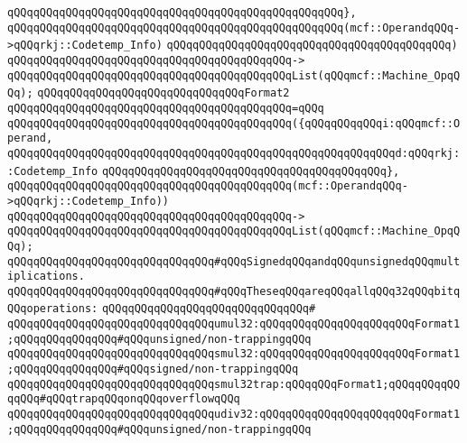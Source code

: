 \verb|qQQqqQQqqQQqqQQqqQQqqQQqqQQqqQQqqQQqqQQqqQQqqQQqqQQq},|\newline
\verb|qQQqqQQqqQQqqQQqqQQqqQQqqQQqqQQqqQQqqQQqqQQqqQQqqQQq(mcf::OperandqQQq->qQQqrkj::Codetemp_Info)|\newline
\verb|qQQqqQQqqQQqqQQqqQQqqQQqqQQqqQQqqQQqqQQqqQQq)|\newline
\verb|qQQqqQQqqQQqqQQqqQQqqQQqqQQqqQQqqQQqqQQqqQQq->|\newline
\verb|qQQqqQQqqQQqqQQqqQQqqQQqqQQqqQQqqQQqqQQqqQQqList(qQQqmcf::Machine_OpqQQq);|\newline
\newline
\verb|qQQqqQQqqQQqqQQqqQQqqQQqqQQqqQQqFormat2|\newline
\verb|qQQqqQQqqQQqqQQqqQQqqQQqqQQqqQQqqQQqqQQqqQQq=qQQq|\newline
\verb|qQQqqQQqqQQqqQQqqQQqqQQqqQQqqQQqqQQqqQQqqQQq({qQQqqQQqqQQqi:qQQqmcf::Operand,|\newline
\verb|qQQqqQQqqQQqqQQqqQQqqQQqqQQqqQQqqQQqqQQqqQQqqQQqqQQqqQQqqQQqd:qQQqrkj::Codetemp_Info|\newline
\verb|qQQqqQQqqQQqqQQqqQQqqQQqqQQqqQQqqQQqqQQqqQQq},|\newline
\verb|qQQqqQQqqQQqqQQqqQQqqQQqqQQqqQQqqQQqqQQqqQQq(mcf::OperandqQQq->qQQqrkj::Codetemp_Info))|\newline
\verb|qQQqqQQqqQQqqQQqqQQqqQQqqQQqqQQqqQQqqQQqqQQq->|\newline
\verb|qQQqqQQqqQQqqQQqqQQqqQQqqQQqqQQqqQQqqQQqqQQqList(qQQqmcf::Machine_OpqQQq);|\newline
\newline
\newline
\verb|qQQqqQQqqQQqqQQqqQQqqQQqqQQqqQQq#qQQqSignedqQQqandqQQqunsignedqQQqmultiplications.|\newline
\verb|qQQqqQQqqQQqqQQqqQQqqQQqqQQqqQQq#qQQqTheseqQQqareqQQqallqQQq32qQQqbitqQQqoperations:|\newline
\verb|qQQqqQQqqQQqqQQqqQQqqQQqqQQqqQQq#|\newline
\verb|qQQqqQQqqQQqqQQqqQQqqQQqqQQqqQQqumul32:qQQqqQQqqQQqqQQqqQQqqQQqFormat1;qQQqqQQqqQQqqQQq#qQQqunsigned/non-trappingqQQq|\newline
\verb|qQQqqQQqqQQqqQQqqQQqqQQqqQQqqQQqsmul32:qQQqqQQqqQQqqQQqqQQqqQQqFormat1;qQQqqQQqqQQqqQQq#qQQqsigned/non-trappingqQQq|\newline
\verb|qQQqqQQqqQQqqQQqqQQqqQQqqQQqqQQqsmul32trap:qQQqqQQqFormat1;qQQqqQQqqQQqqQQq#qQQqtrapqQQqonqQQqoverflowqQQq|\newline
\verb|qQQqqQQqqQQqqQQqqQQqqQQqqQQqqQQqudiv32:qQQqqQQqqQQqqQQqqQQqqQQqFormat1;qQQqqQQqqQQqqQQq#qQQqunsigned/non-trappingqQQq|\newline
